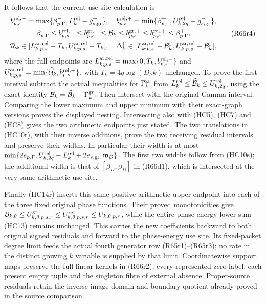 It follows that the current use-site calculation is
\[
\begin{gathered}
 b_{p,s}^{\rm rel,-}
 =\max\{\beta_{p,\Gamma}^-,L_k^{\rm rel}-g_{s,\rm gr}^+\},
 \quad
 b_{p,s}^{\rm rel,+}
 =\min\{\beta_{p,\Gamma}^+,U_{k,2q}^{\rm rel}-g_{s,\rm gr}^-\},\\
 \beta_{p,\Gamma}^-\leq b_{p,s}^{\rm rel,-}
 \leq b_{p,s}^{\rm gr,-}\leq\mathcal B_k
 \leq b_{p,s}^{\rm gr,+}\leq b_{p,s}^{\rm rel,+}
 \leq\beta_{p,\Gamma}^+,\\
 \mathcal R_k\in
 [L_{k;p,s}^{\rm ar,rel}-T_k,U_{k;p,s}^{\rm ar,rel}-T_k],
 \quad
 \Delta_k^\Gamma\in
 [L_{k;p,s}^{\rm ar,rel}-\mathcal B_k^\Gamma,
  U_{k;p,s}^{\rm ar,rel}-\mathcal B_k^\Gamma],
\end{gathered}\tag{R66r4}
\]
where the full endpoints are
$L_{k;p,s}^{\rm ar,rel}=\max\{0,T_k,b_{p,s}^{\rm rel,-}\}$
and
$U_{k;p,s}^{\rm ar,rel}=\min\{\widehat{\mathcal U}_k,
b_{p,s}^{\rm rel,+}\}$, with $T_k=4q\log(D_hk)$ unchanged.
To prove the first interval subtract the actual inequalities
for $\Gamma_k^{\rm gr}$ from
$L_k^{\rm rel}\leq\widehat{\mathcal B}_k\leq U_{k,2q}^{\rm rel}$,
using the exact identity
$\mathcal B_k=\widehat{\mathcal B}_k-\Gamma_k^{\rm gr}$.
Then intersect with the original Gamma interval. Comparing the
lower maximum and upper minimum with their exact-graph versions
proves the displayed nesting. Intersecting also with (HC5),
(HC7) and (HC8) gives the two arithmetic endpoints just stated.
The two translations in (HC10r), with their inverse additions,
prove the two receiving residual intervals and preserve their
widths. In particular their width is at most
$\min\{2e_{p,\Gamma},U_{k,2q}^{\rm rel}-L_k^{\rm rel}
+2e_{s,\rm gr},\mathfrak w_D\}$.
The first two widths follow from (HC10s); the additional
width is that of $[\beta_D^-,\beta_D^+]$ in (R66d1),
which is intersected at the very same arithmetic use site.

Finally (HC14r) inserts this same positive arithmetic upper
endpoint into each of the three fixed original phase functions.
Their proved monotonicities give
$\mathcal B_{k,\theta}\leq U_{k,\theta;p,s,r}^{\rm gr}
\leq U_{k,\theta;p,s,r}^{\rm rel}\leq U_{k,\theta;p,r}$,
while the entire phase-energy lower sum (HC13) remains unchanged.
This carries the new coefficients backward to both original
signed residuals and forward to the phase-energy use site.
Its fixed-packet degree limit feeds the actual fourth generator
row (R65r1)--(R65r3); no rate in the distinct growing $k$ variable
is supplied by that limit. Coordinatewise support maps preserve
the full linear kernels in (R66r2), every represented-zero label,
each present empty tuple and the singleton fibre of external
absence. Proper-source residuals retain the inverse-image domain
and boundary quotient already proved in the source comparison.


